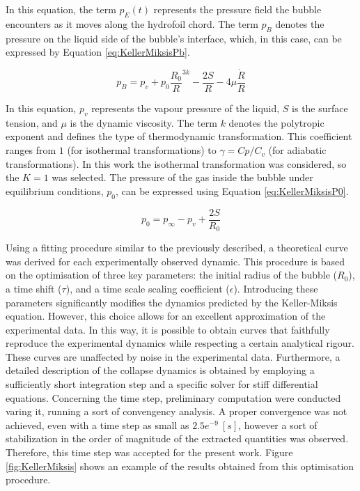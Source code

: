 In this equation, the term $p_E(t)$ represents the pressure field the bubble encounters as it moves along the hydrofoil chord. The term $p_B$ denotes the pressure on the liquid side of the bubble's interface, which, in this case, can be expressed by Equation \ref{eq:KellerMiksisPb}.

\begin{equation}
    p_B = p_v + p_0 \frac{R_0}{R}^{3k} - \frac{2S}{R} - 4\mu \frac{\dot{R}}{R}
    \label{eq:KellerMiksisPb}
\end{equation}

In this equation, $p_v$ represents the vapour pressure of the liquid, $S$ is the surface tension, and $\mu$ is the dynamic viscosity. The term $k$ denotes  the polytropic exponent and defines the type of thermodynamic transformation. This coefficient ranges from $1$ (for isothermal transformations) to $\gamma = Cp/C_v$ (for adiabatic transformations). In this work the isothermal transformation was considered, so the $K = 1$ was selected.
The pressure of the gas inside the bubble under equilibrium conditions, $p_0$, can be expressed using Equation \ref{eq:KellerMiksisP0}.

\begin{equation}
    p_0 = p_\infty - p_v + \frac{2S}{R_0} 
    \label{eq:KellerMiksisP0}
\end{equation}

Using a fitting procedure similar to the previously described, a theoretical curve was derived for each experimentally observed dynamic. This procedure is based on the optimisation of three key parameters: the initial radius of the bubble ($R_0$), a time shift ($\tau$), and a time scale scaling coefficient ($\epsilon$).
Introducing these parameters significantly modifies the dynamics predicted by the Keller-Miksis equation. However, this choice allows for an excellent approximation of the experimental data.
In this way, it is possible to obtain curves that faithfully reproduce the experimental dynamics while respecting a certain analytical rigour. These curves are unaffected by noise in the experimental data. Furthermore, a detailed description of the collapse dynamics is obtained by employing a sufficiently short integration step and a specific solver for stiff differential equations.
Concerning the time step, preliminary computation were conducted varing it, running a sort of convengency analysis. A proper convergence was not achieved, even with a time step as small as $2.5e^{-9} \ [s]$, however a sort of stabilization in the order of magnitude of the extracted quantities was observed. Therefore, this time step was accepted for the present work.
Figure \ref{fig:KellerMiksis} shows an example of the results obtained from this optimisation procedure.

